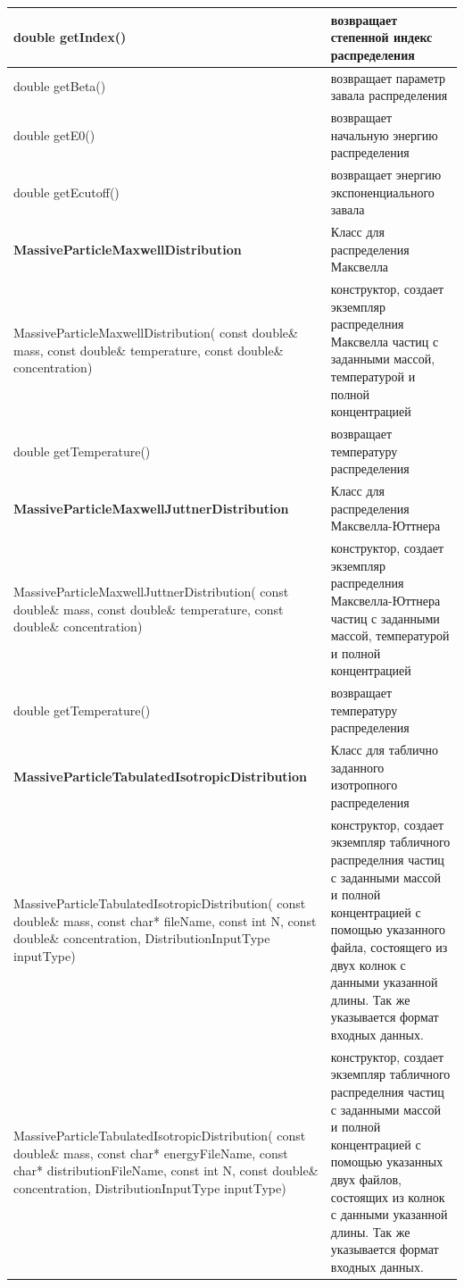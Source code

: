 \begin{small}
\begin{xtabular}{|p{0.52\textwidth}|p{0.48\textwidth}|}
		\hline
		double getIndex() & возвращает степенной индекс распределения \\
		\hline
		double getBeta() & возвращает параметр завала распределения \\
		\hline
		double getE0() & возвращает начальную энергию распределения\\
		\hline
		double getEcutoff() & возвращает энергию экспоненциального завала\\
		\hline
		\textbf{MassiveParticleMaxwellDistribution} & Класс для распределения Максвелла\\
		\hline
		MassiveParticleMaxwellDistribution( const double\& mass, const double\& temperature, const double\& concentration) & конструктор, создает экземпляр распределния Максвелла частиц с заданными массой, температурой и полной концентрацией\\
		\hline
		double getTemperature() & возвращает температуру распределения\\
		\hline
		\textbf{MassiveParticleMaxwellJuttnerDistribution} & Класс для распределения Максвелла-Юттнера\\
		\hline
		MassiveParticleMaxwellJuttnerDistribution( const double\& mass, const double\& temperature, const double\& concentration) & конструктор, создает экземпляр распределния Максвелла-Юттнера частиц с заданными массой, температурой и полной концентрацией\\
		\hline
		double getTemperature() & возвращает температуру распределения\\
		\hline
		\textbf{MassiveParticleTabulatedIsotropicDistribution} & Класс для таблично заданного изотропного распределения\\
		\hline
		MassiveParticleTabulatedIsotropicDistribution( const double\& mass, const char* fileName, const int N, const double\& concentration, DistributionInputType inputType) & конструктор, создает экземпляр табличного распределния частиц с заданными массой и полной концентрацией с помощью указанного файла, состоящего из двух колнок с данными указанной длины. Так же указывается формат входных данных.\\
		\hline
		MassiveParticleTabulatedIsotropicDistribution( const double\& mass, const char* energyFileName, const char* distributionFileName, const int N, const double\& concentration, DistributionInputType inputType) & конструктор, создает экземпляр табличного распределния частиц с заданными массой и полной концентрацией с помощью указанных двух файлов, состоящих из колнок с данными указанной длины. Так же указывается формат входных данных. \\

\end{xtabular}
\end{small}
